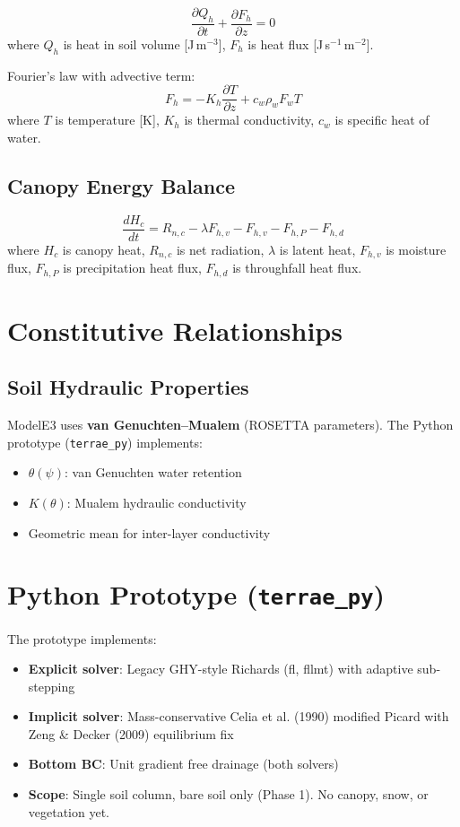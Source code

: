 \documentclass[11pt,a4paper]{article}
\begin{document}
\begin{equation}
\frac{\partial Q_h}{\partial t} + \frac{\partial F_h}{\partial z} = 0
\end{equation}
where $Q_h$ is heat in soil volume [J\,m$^{-3}$], $F_h$ is heat flux [J\,s$^{-1}$\,m$^{-2}$].

Fourier's law with advective term:
\begin{equation}
F_h = -K_h \frac{\partial T}{\partial z} + c_w \rho_w F_w T
\end{equation}
where $T$ is temperature [K], $K_h$ is thermal conductivity, $c_w$ is specific heat of water.

\subsection{Canopy Energy Balance}

\begin{equation}
\frac{dH_c}{dt} = R_{n,c} - \lambda F_{h,v} - F_{h,v} - F_{h,P} - F_{h,d}
\end{equation}
where $H_c$ is canopy heat, $R_{n,c}$ is net radiation, $\lambda$ is latent heat, $F_{h,v}$ is moisture flux, $F_{h,P}$ is precipitation heat flux, $F_{h,d}$ is throughfall heat flux.

\section{Constitutive Relationships}

\subsection{Soil Hydraulic Properties}

ModelE3 uses \textbf{van Genuchten--Mualem} (ROSETTA parameters). The Python prototype (\texttt{terrae\_py}) implements:
\begin{itemize}
\item $\theta(\psi)$: van Genuchten water retention
\item $K(\theta)$: Mualem hydraulic conductivity
\item Geometric mean for inter-layer conductivity
\end{itemize}

\section{Python Prototype (\texttt{terrae\_py})}

The prototype implements:
\begin{itemize}
\item \textbf{Explicit solver}: Legacy GHY-style Richards (fl, fllmt) with adaptive sub-stepping
\item \textbf{Implicit solver}: Mass-conservative Celia et al. (1990) modified Picard with Zeng \& Decker (2009) equilibrium fix
\item \textbf{Bottom BC}: Unit gradient free drainage (both solvers)
\item \textbf{Scope}: Single soil column, bare soil only (Phase 1). No canopy, snow, or vegetation yet.
\end{itemize}
\end{document}
